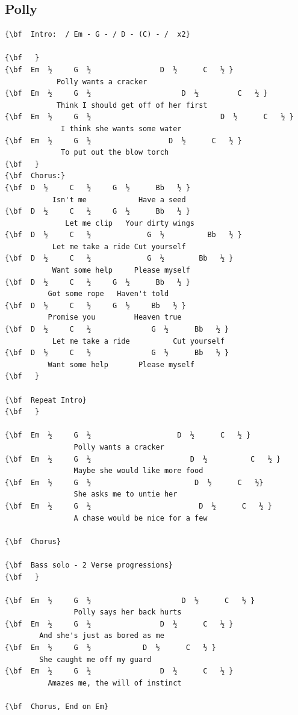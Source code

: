 \documentclass[a4paper]{article}
\begin{document}
\subsection{Polly}
\begin{Verbatim}[commandchars=\\\{\}]
{\bf  Intro:  / Em - G - / D - (C) - /  x2}

{\bf   }
{\bf  Em  ½     G  ½                D  ½      C   ½ }
            Polly wants a cracker
{\bf  Em  ½     G  ½                     D  ½         C   ½ }
            Think I should get off of her first
{\bf  Em  ½     G  ½                              D  ½      C   ½ }
             I think she wants some water
{\bf  Em  ½     G  ½                  D  ½      C   ½ }
             To put out the blow torch
{\bf   }
{\bf  Chorus:}
{\bf  D  ½     C   ½     G  ½      Bb   ½ }
           Isn't me            Have a seed
{\bf  D  ½     C   ½     G  ½      Bb   ½ }
              Let me clip   Your dirty wings
{\bf  D  ½     C   ½             G  ½          Bb   ½ }
           Let me take a ride Cut yourself
{\bf  D  ½     C   ½             G  ½        Bb   ½ }
           Want some help     Please myself
{\bf  D  ½     C   ½     G  ½      Bb   ½ }
          Got some rope   Haven't told
{\bf  D  ½     C   ½     G  ½     Bb   ½ }
          Promise you         Heaven true
{\bf  D  ½     C   ½              G  ½      Bb   ½ }
           Let me take a ride          Cut yourself
{\bf  D  ½     C   ½              G  ½      Bb   ½ }
          Want some help       Please myself
{\bf   }

{\bf  Repeat Intro}
{\bf   }

{\bf  Em  ½     G  ½                    D  ½      C   ½ }
                Polly wants a cracker
{\bf  Em  ½     G  ½                       D  ½          C   ½ }
                Maybe she would like more food
{\bf  Em  ½     G  ½                        D  ½      C   ½}
                She asks me to untie her
{\bf  Em  ½     G  ½                         D  ½      C   ½ }
                A chase would be nice for a few

{\bf  Chorus}

{\bf  Bass solo - 2 Verse progressions}
{\bf   }

{\bf  Em  ½     G  ½                     D  ½      C   ½ }
                Polly says her back hurts
{\bf  Em  ½     G  ½                D  ½      C   ½ }
        And she's just as bored as me
{\bf  Em  ½     G  ½            D  ½      C   ½ }
        She caught me off my guard
{\bf  Em  ½     G  ½                D  ½      C   ½ }
          Amazes me, the will of instinct

{\bf  Chorus, End on Em}

\end{Verbatim}
\newpage
\end{document}
